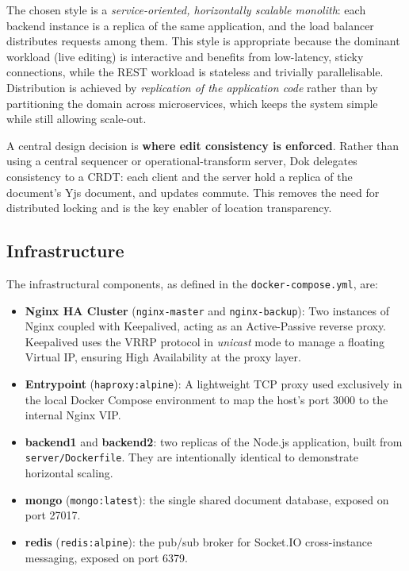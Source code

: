 \documentclass{scrartcl}
\begin{document}
  The chosen style is a \emph{service-oriented, horizontally scalable monolith}: each backend instance is a replica of the same application, and the load balancer distributes requests among them. This style is appropriate because the dominant workload (live editing) is interactive and benefits from low-latency, sticky connections, while the REST workload is stateless and trivially parallelisable. Distribution is achieved by \emph{replication of the application code} rather than by partitioning the domain across microservices, which keeps the system simple while still allowing scale-out.

  A central design decision is \textbf{where edit consistency is enforced}. Rather than using a central sequencer or operational-transform server, Dok delegates consistency to a CRDT: each client and the server hold a replica of the document's Yjs document, and updates commute. This removes the need for distributed locking and is the key enabler of location transparency.

  \subsection{Infrastructure}\label{infrastructure}

  The infrastructural components, as defined in the \texttt{docker-compose.yml}, are:

  \begin{itemize}
    \item \textbf{Nginx HA Cluster} (\texttt{nginx-master} and \texttt{nginx-backup}):
    Two instances of Nginx coupled with Keepalived, acting as an Active-Passive reverse proxy.
    Keepalived uses the VRRP protocol in \textit{unicast} mode to manage a floating Virtual IP,
    ensuring High Availability at the proxy layer.
    \item \textbf{Entrypoint} (\texttt{haproxy:alpine}):
    A lightweight TCP proxy used exclusively in the local Docker Compose environment
    to map the host's port 3000 to the internal Nginx VIP.
    \item \textbf{backend1} and \textbf{backend2}: two replicas of the Node.js application, built from \texttt{server/Dockerfile}. They are intentionally identical to demonstrate horizontal scaling.
    \item \textbf{mongo} (\texttt{mongo:latest}): the single shared document database, exposed on port 27017.
    \item \textbf{redis} (\texttt{redis:alpine}): the pub/sub broker for Socket.IO cross-instance messaging, exposed on port 6379.
  \end{itemize}
\end{document}
